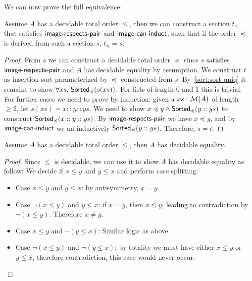 We can now prove the full equivalence:
\begin{proposition}\label{sort:s2o2s}
    Assume $A$ has a decidable total order $\leq$, then we can construct
    a section $t_\leq$ that satisfies $\operatorname{\mathsf{image-respects-pair}}$ and $\operatorname{\mathsf{image-can-induct}}$,
    such that if the order $\preccurlyeq$ is derived from such a section $s$,
    $t_\preccurlyeq = s$.
\end{proposition}
\begin{proof}
    From $s$ we can construct a decidable total order $\preccurlyeq$ since $s$ satisfies
    $\operatorname{\mathsf{image-respects-pair}}$ and $A$ has decidable equality by assumption.
    We construct $t$ as insertion sort parameterized by $\preccurlyeq$ constructed from $s$.
    By~\cref{sort:sort-uniq} it remains to show $\forall xs.\,\operatorname{\mathsf{Sorted}}_{\preccurlyeq}(s(xs))$.
    For lists of length 0 and 1 this is trivial. For further cases we need to prove by induction:
    given a $xs : \mathcal{M}(A)$ of length $\geq 2$, let $s(xs) = x :: y :: ys$. We need to show
    $x \preccurlyeq y \land \operatorname{\mathsf{Sorted}}_{\preccurlyeq}(y :: ys)$ to construct
    $\operatorname{\mathsf{Sorted}}_{\preccurlyeq}(x :: y :: ys)$.
    By $\operatorname{\mathsf{image-respects-pair}}$ we have $x \preccurlyeq y$, and by $\operatorname{\mathsf{image-can-induct}}$ we an
    inductively $\operatorname{\mathsf{Sorted}}_{\preccurlyeq}(y :: ys)$.
    Therefore, $s = t$.
\end{proof}

\begin{proposition}\label{sort:decord-to-deceq}
    Assume $A$ has a decidable total order $\leq$,
    then $A$ has decidable equality.
\end{proposition}
\begin{proof}
    Since $\leq$ is decidable, we can use it to show $A$ has decidable equality as follow:
    We decide if $x \leq y$ and $y \leq x$ and perform case splitting:
    \begin{itemize}
        \item
              Case $x \leq y$ and $y \leq x$: by antisymmetry, $x = y$.
        \item
              Case $\neg(x \leq y)$ and $y \leq x$: if $x = y$, then $x \leq y$,
              leading to contradiction by $\neg(x \leq y)$. Therefore $x \neq y$.
        \item
              Case $x \leq y$ and $\neg(y \leq x)$: Similar logic as above.
        \item
              Case $\neg(x \leq y)$ and $\neg(y \leq x)$: by totality we must have either
              $x \leq y$ or $y \leq x$, therefore contradiction, this case would never occur.
    \end{itemize}
\end{proof}

